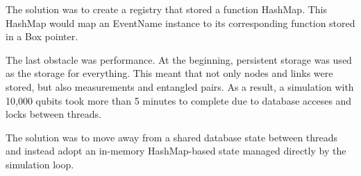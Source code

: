 The solution was to create a registry that stored a function HashMap. This HashMap would map an EventName instance to its corresponding function stored in a Box pointer.

The last obstacle was performance. At the beginning, persistent storage was used as the storage for everything. This meant that not only nodes and links were stored, but also measurements and entangled pairs. As a result, a simulation with 10,000 qubits took more than 5 minutes to complete due to database acceses and locks between threads.

The solution was to move away from a shared database state between threads and instead adopt an in-memory HashMap-based state managed directly by the simulation loop.
